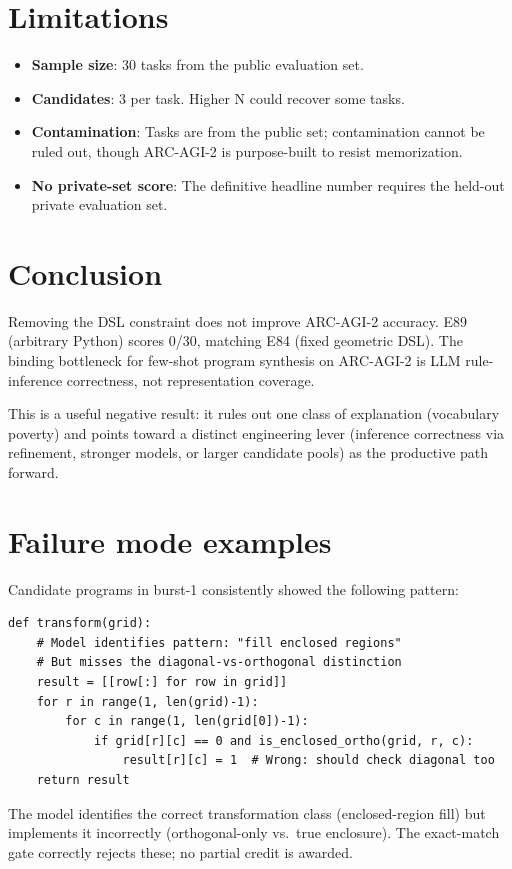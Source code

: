 \documentclass[11pt]{article}
\begin{document}
\section{Limitations}
\label{sec:limitations}

\begin{itemize}
  \item \textbf{Sample size}: 30 tasks from the public evaluation set.
  \item \textbf{Candidates}: 3 per task.  Higher N could recover some tasks.
  \item \textbf{Contamination}: Tasks are from the public set; contamination
        cannot be ruled out, though ARC-AGI-2 is purpose-built to resist
        memorization.
  \item \textbf{No private-set score}: The definitive headline number requires
        the held-out private evaluation set.
\end{itemize}

\section{Conclusion}
\label{sec:conclusion}

Removing the DSL constraint does not improve ARC-AGI-2 accuracy.  E89
(arbitrary Python) scores 0/30, matching E84 (fixed geometric DSL).
The binding bottleneck for few-shot program synthesis on ARC-AGI-2 is
LLM rule-inference correctness, not representation coverage.

This is a useful negative result: it rules out one class of explanation
(vocabulary poverty) and points toward a distinct engineering lever
(inference correctness via refinement, stronger models, or larger candidate
pools) as the productive path forward.

\appendix
\section{Failure mode examples}
\label{sec:appendix}

Candidate programs in burst-1 consistently showed the following pattern:

\begin{lstlisting}[style=housespecpy]
def transform(grid):
    # Model identifies pattern: "fill enclosed regions"
    # But misses the diagonal-vs-orthogonal distinction
    result = [[row[:] for row in grid]]
    for r in range(1, len(grid)-1):
        for c in range(1, len(grid[0])-1):
            if grid[r][c] == 0 and is_enclosed_ortho(grid, r, c):
                result[r][c] = 1  # Wrong: should check diagonal too
    return result
\end{lstlisting}

The model identifies the correct transformation class (enclosed-region fill)
but implements it incorrectly (orthogonal-only vs.\ true enclosure).  The
exact-match gate correctly rejects these; no partial credit is awarded.
\end{document}
